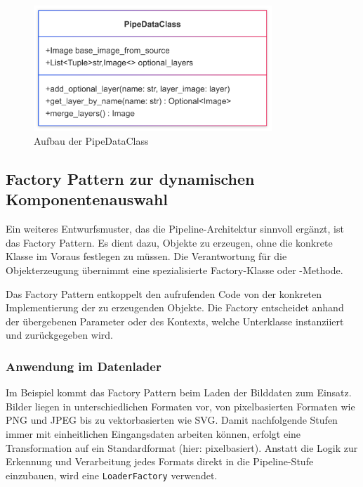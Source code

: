 \documentclass[10pt,a4paper]{article}
\begin{document}
\begin{figure}[htbp]
    \centering
    \includegraphics[width=0.8\textwidth]{img/PipeDataClass.png}
    \caption{Aufbau der PipeDataClass}
    \label{fig:pipeDataClass}
\end{figure}

\subsection{Factory Pattern zur dynamischen Komponentenauswahl}
Ein weiteres Entwurfsmuster, das die Pipeline-Architektur sinnvoll ergänzt, ist das Factory Pattern. Es dient dazu, Objekte zu erzeugen, ohne die konkrete Klasse im Voraus festlegen zu müssen. Die Verantwortung für die Objekterzeugung übernimmt eine spezialisierte Factory-Klasse oder -Methode.

Das Factory Pattern entkoppelt den aufrufenden Code von der konkreten Implementierung der zu erzeugenden Objekte. Die Factory entscheidet anhand der übergebenen Parameter oder des Kontexts, welche Unterklasse instanziiert und zurückgegeben wird.

\subsubsection{Anwendung im Datenlader}
Im Beispiel kommt das Factory Pattern beim Laden der Bilddaten zum Einsatz. Bilder liegen in unterschiedlichen Formaten vor, von pixelbasierten Formaten wie PNG und JPEG bis zu vektorbasierten wie SVG. Damit nachfolgende Stufen immer mit einheitlichen Eingangsdaten arbeiten können, erfolgt eine Transformation auf ein Standardformat (hier: pixelbasiert). Anstatt die Logik zur Erkennung und Verarbeitung jedes Formats direkt in die Pipeline-Stufe einzubauen, wird eine \texttt{LoaderFactory} verwendet.
\end{document}
